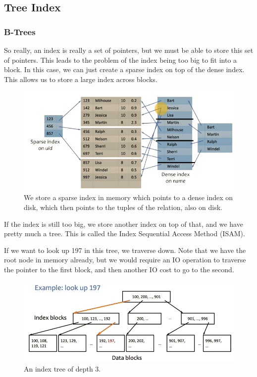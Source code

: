 \subsection{Tree Index} 

  \subsubsection{B-Trees}

    So really, an index is really a set of pointers, but we must be able to store this set of pointers. This leads to the problem of the index being too big to fit into a block. In this case, we can just create a sparse index on top of the dense index. This allows us to store a large index across blocks. 
    
    \begin{figure}[H]
      \centering 
      \includegraphics[scale=0.4]{img/too_big.png}
      \caption{We store a sparse index in memory which points to a dense index on disk, which then points to the tuples of the relation, also on disk. } 
      \label{fig:too_big}
    \end{figure}

    If the index is still too big, we store another index on top of that, and we have pretty much a tree. This is called the Index Sequential Access Method (ISAM). 
    
    \begin{example}
      If we want to look up 197 in this tree, we traverse down. Note that we have the root node in memory already, but we would require an IO operation to traverse the pointer to the first block, and then another IO cost to go to the second. 
      \begin{figure}[H]
        \centering 
        \includegraphics[scale=0.4]{img/isam_lookup.png}
        \caption{An index tree of depth 3.} 
        \label{fig:isam_lookup}
      \end{figure}
    \end{example}

